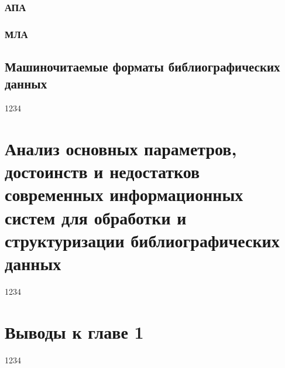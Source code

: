\subsubsection{АПА}


\subsubsection{МЛА}


\subsection{Машиночитаемые форматы библиографических данных}
1234

\section{Анализ основных параметров, достоинств и недостатков современных информационных систем для обработки и структуризации библиографических данных}
1234

\section*{Выводы к главе 1}
1234
